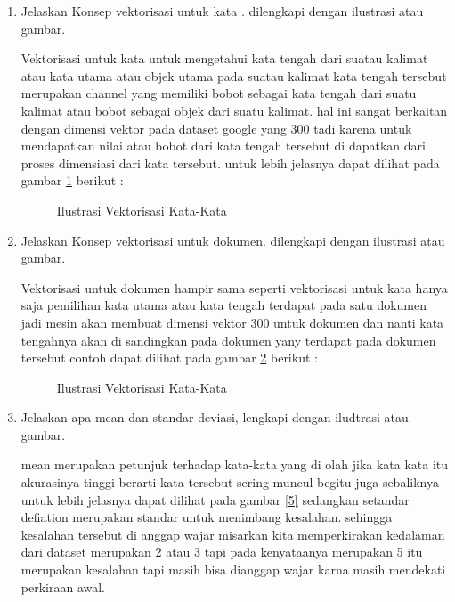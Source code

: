 \begin{enumerate}
\item Jelaskan Konsep vektorisasi untuk kata . dilengkapi dengan ilustrasi atau gambar. \par
Vektorisasi untuk kata untuk mengetahui kata tengah dari suatau kalimat atau kata utama atau objek utama pada suatau kalimat kata tengah tersebut merupakan channel yang memiliki bobot sebagai kata tengah dari suatu kalimat atau bobot sebagai objek dari suatu kalimat. hal ini sangat berkaitan dengan dimensi vektor pada dataset google yang 300 tadi karena untuk mendapatkan nilai atau bobot dari kata tengah tersebut di dapatkan dari proses dimensiasi dari kata tersebut. untuk lebih jelasnya dapat dilihat pada gambar \ref{3} berikut :

\begin{figure}[!htbp]
    \caption{Ilustrasi Vektorisasi Kata-Kata}
    \label{3}
    \end{figure}

\item Jelaskan Konsep vektorisasi untuk dokumen. dilengkapi dengan ilustrasi atau gambar. \par
Vektorisasi untuk dokumen hampir sama seperti vektorisasi untuk kata hanya saja pemilihan kata utama atau kata tengah terdapat pada satu dokumen jadi mesin akan membuat dimensi vektor 300 untuk dokumen dan nanti kata tengahnya akan di sandingkan pada dokumen yany terdapat pada dokumen tersebut contoh dapat dilihat pada gambar \ref{4} berikut : 

\begin{figure}[!htbp]
    \caption{Ilustrasi Vektorisasi Kata-Kata}
    \label{4}
    \end{figure}

\item Jelaskan apa mean dan standar deviasi, lengkapi dengan iludtrasi atau gambar. \par
mean merupakan petunjuk terhadap kata-kata yang di olah jika kata kata itu akurasinya tinggi berarti kata tersebut sering muncul begitu juga sebaliknya untuk lebih jelasnya dapat dilihat pada gambar \ref{5} sedangkan setandar defiation merupakan standar untuk menimbang kesalahan. sehingga kesalahan tersebut di anggap wajar misarkan kita memperkirakan kedalaman dari dataset merupakan 2 atau 3 tapi pada kenyataanya merupakan 5 itu merupakan kesalahan tapi masih bisa dianggap wajar karna masih mendekati perkiraan awal.


\end{enumerate}
